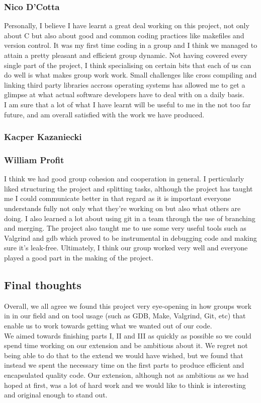 \documentclass[11pt]{article}
\begin{document}
\subsubsection{Nico D'Cotta}
Personally, I believe I have learnt a great deal working on this project, not
only about C but also about good and common coding practices like makefiles and
version control.
It was my first time coding in a group and I think we managed to attain a pretty
pleasant and efficient group dynamic. Not having covered every single part of
the project, I think specialising on certain bits that each of us can do well is
what makes group work work. Small challenges like cross compiling and linking
third party libraries accross operating systems has allowed me to get a glimpse
at what actual software developers have to deal with on a daily basis.\\

I am sure that a lot of what I have learnt will be useful to me in the not too
far future, and am overall satisfied with the work we have produced.\\


\subsubsection{Kacper Kazaniecki}
\subsubsection{William Profit}
I think we had good group cohesion and cooperation in general. I perticularly
liked structuring the project and splitting tasks, although the project has
taught me I could communicate better in that regard as it is important everyone
understands fully not only what they're working on but also what others are doing. I also
learned a lot about using git in a team through the use of branching and
merging. The project also taught me to use some very useful tools such as
Valgrind and gdb which proved to be instrumental in debugging code and making
sure it's leak-free. Ultimately, I think our group worked very well and everyone
played a good part in the making of the project.\\

\subsection{Final thoughts}
Overall, we all agree we found this project very eye-opening in how 
groups work in in our field and on tool usage (such as GDB, Make,
Valgrind, Git, etc) that enable us to work towards getting what we 
wanted out of our code. \\

We aimed towards finishing parts I, II and III as quickly as possible so we could spend time
working on our extension and be ambitious about it. We regret not being
able to do that to the extend we would have wished, but we found that 
instead we spent the necessary time on the first parts to produce 
efficient and encapsulated quality code. Our extension, although not
as ambitious as we had hoped at first, was a lot of hard work and we 
would like to think is interesting and original enough to stand out.\\
\end{document}
